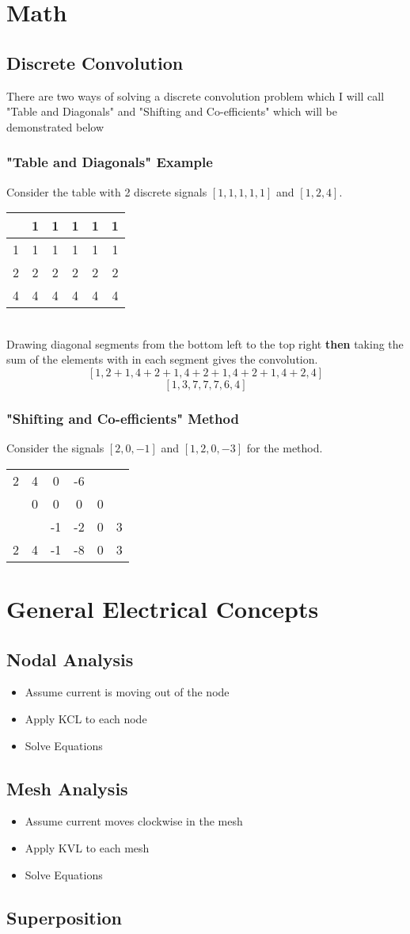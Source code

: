 \documentclass{article}
\begin{document}
\section*{Math}
\subsection*{Discrete Convolution}
There are two ways of solving a discrete convolution problem which I will call "Table and Diagonals" and "Shifting and Co-efficients" which will be demonstrated below
\subsubsection*{"Table and Diagonals" Example}
Consider the table with 2 discrete signals $ [1,1,1,1,1] $ and $ [1,2,4] $.\\
\begin{tabular}{c|ccccc}
	&1&1&1&1&1\\
	\hline
	1&1&1&1&1&1\\
	2&2&2&2&2&2\\
	4&4&4&4&4&4
\end{tabular}\\
Drawing diagonal segments from the bottom left to the top right \textbf{then} taking the sum of the elements with in each segment gives the convolution.
\[ [1, 2+1, 4+2+1, 4+2+1, 4+2+1, 4+2, 4] \]
\[ [1, 3, 7, 7, 7, 6, 4] \]
\subsubsection*{"Shifting and Co-efficients" Method}
Consider the signals $ [2,0,-1] $ and $ [1, 2, 0, -3] $ for the method.\\
\begin{tabular}{cccccc}
	2&4&0&-6&&\\
	&0&0&0&0&\\
	&&-1&-2&0&3\\
	\hline
	2&4&-1&-8&0&3
\end{tabular}
\section*{General Electrical Concepts}
\subsection*{Nodal Analysis}
\begin{itemize}
\item Assume current is moving out of the node
\item Apply KCL to each node
\item Solve Equations
\end{itemize}
\subsection*{Mesh Analysis}
\begin{itemize}
\item Assume current moves clockwise in the mesh
\item Apply KVL to each mesh
\item Solve Equations
\end{itemize}
\subsection*{Superposition}
\end{document}
